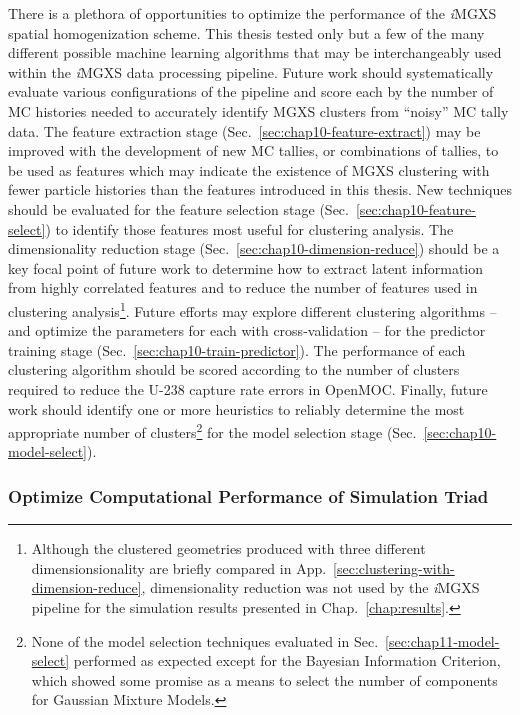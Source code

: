 There is a plethora of opportunities to optimize the performance of the \textit{i}\ac{MGXS} spatial homogenization scheme. This thesis tested only but a few of the many different possible machine learning algorithms that may be interchangeably used within the \textit{i}\ac{MGXS} data processing pipeline. Future work should systematically evaluate various configurations of the pipeline and score each by the number of \ac{MC} histories needed to accurately identify \ac{MGXS} clusters from ``noisy'' \ac{MC} tally data. The feature extraction stage (Sec.~\ref{sec:chap10-feature-extract}) may be improved with the development of new \ac{MC} tallies, or combinations of tallies, to be used as features which may indicate the existence of \ac{MGXS} clustering with fewer particle histories than the features introduced in this thesis. New techniques should be evaluated for the feature selection stage (Sec.~\ref{sec:chap10-feature-select}) to identify those features most useful for clustering analysis. The dimensionality reduction stage (Sec.~\ref{sec:chap10-dimension-reduce}) should be a key focal point of future work to determine how to extract latent information from highly correlated features and to reduce the number of features used in clustering analysis\footnote{Although the clustered geometries produced with three different dimensionsionality are briefly compared in App.~\ref{sec:clustering-with-dimension-reduce}, dimensionality reduction was not used by the \textit{i}\ac{MGXS} pipeline for the simulation results presented in Chap.~\ref{chap:results}.}. Future efforts may explore different clustering algorithms -- and optimize the parameters for each with cross-validation -- for the predictor training stage (Sec.~\ref{sec:chap10-train-predictor}). The performance of each clustering algorithm should be scored according to the number of clusters required to reduce the U-238 capture rate errors in OpenMOC. Finally, future work should identify one or more heuristics to reliably determine the most appropriate number of clusters\footnote{None of the model selection techniques evaluated in Sec.~\ref{sec:chap11-model-select} performed as expected except for the Bayesian Information Criterion, which showed some promise as a means to select the number of components for Gaussian Mixture Models.} for the model selection stage (Sec.~\ref{sec:chap10-model-select}).

\subsubsection{Optimize Computational Performance of Simulation Triad}
\label{subsubsec:chap12-optimize-simulation-triad}

